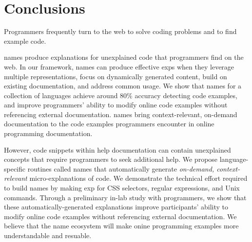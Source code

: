 \section{Conclusions}

Programmers frequently turn to the web to solve coding problems and to find example code.
\begin{changes}
\Glspl{name} produce explanations for unexplained code that programmers find on the web.
In our framework, \Glspl{name} can produce effective \glspl{exp} when they leverage multiple representations, focus on dynamically generated content, build on existing documentation, and address common usage.
We show that \Glspl{name} for a collection of languages achieve around 80\% accuracy detecting code examples, and improve programmers' ability to modify online code examples without referencing external documentation.
\Glspl{name} bring context-relevant, on-demand documentation to the code examples programmers encounter in online programming documentation.
\end{changes}

However, code snippets within  help documentation can contain unexplained concepts that require programmers to seek additional help.
We propose language-specific routines called \Glspl{name} that automatically generate \emph{on-demand, context-relevant} micro-explanations of code.
We demonstrate the technical effort required to build \Glspl{name} by making \gls{exp} for CSS selectors, regular expressions, and Unix commands.
Through a preliminary in-lab study with programmers, we show that these automatically-generated explanations improve participants' ability to modify online code examples without referencing external documentation.
We believe that the \Gls{name} ecosystem will make onine programming examples more understandable and resuable.
\fi
